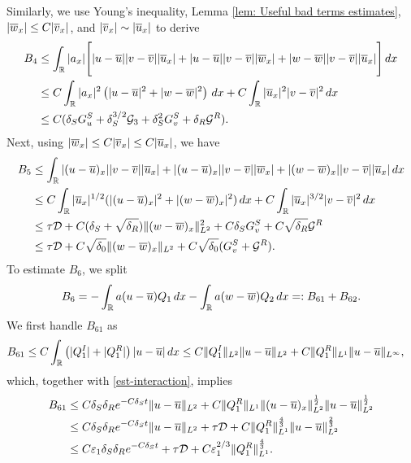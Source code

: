 \documentclass[11pt,reqno]{amsart}
\begin{document}
    Similarly, we use Young's inequality, Lemma \ref{lem: Useful bad terms estimates}, $|\overline{w}_x| \le C |\overline{v}_x| $, and  $|\overline{v}_x| \sim |\overline{u}_x|$ to derive
    \begin{align*}
    B_4 &\le \int_\mathbb{R} |a_x| \Bigg[ |u-\overline{u}| |v-\overline{v}|     |\overline{u}_x|  +|u-\overline{u}| |v-\overline{v}|  | \overline{w}_x|  + |w-\overline{w}| |v-\overline{v}| |\overline{u}_x|   \Bigg] \, dx \\ 
    &\le C \int_\mathbb{R} |a_x|^2 \left(|u-\overline{u}|^2+|w-\overline{w}|^2 \right)\,dx +C\int_\mathbb{R} |\overline{u}_x|^2 |v-\overline{v}|^2 \, dx \\ 
    &\le C (\delta_S G^S_u +  \delta_S^{3/2} \mathcal{G}_3 + \delta_S^2 G^S_v + \delta_R \mathcal{G}^R).
    \end{align*}
 	Next, using $|\overline{w}_x| \le C |\overline{v}_x| \le C |\overline{u}_x|$, we have
    \begin{align*}
    B_5 &\le \int_\mathbb{R}  |(u-\overline{u})_x| |v-\overline{v}|    |\overline{u}_x|  +  |(u-\overline{u})_x| |v-\overline{v}| | \overline{w}_x|  + |(w-\overline{w})_x| |v-\overline{v}| |\overline{u}_x|  \, dx \\
    &\le C \int_\mathbb{R} |\overline{u}_x|^{1/2} (|(u-\overline{u})_x|^2 + |(w-\overline{w})_x|^2 ) \, dx + C \int_\mathbb{R} |\overline{u}_x|^{3/2} |v-\overline{v}|^2 \, dx \\ 
    &\le \tau \mathcal{D} + C (\delta_S +\sqrt{\delta_R}) \|(w-\overline{w})_x\|_{L^2}^2+C \delta_S G^S_v+ C \sqrt{\delta_R} \mathcal{G}^R  \\
    &\le \tau \mathcal{D} + C \sqrt{\delta_0} \|(w-\overline{w})_x\|_{L^2} + C \sqrt{\delta_0} (G^S_v+\mathcal{G}^R).
    \end{align*}
	To estimate $B_6$, we split
	\[B_6 = -\int_{\mathbb{R}}a(u-\overline{u})Q_1\,dx -\int_{\mathbb{R}}a(w-\overline{w})Q_2\,dx=:B_{61}+B_{62}.\]
	We first handle $B_{61}$ as
    \begin{align*}
        B_{61} & \le C \int_\mathbb{R} \left( |Q_1^I| + |Q_1^R| \right) |u-\overline{u}| \, dx \le C  \|Q_1^I\|_{L^2} \| u-\overline{u} \|_{L^2} + C \|Q_1^R \|_{L^1} \| u-\overline{u} \|_{L^\infty}  ,
    \end{align*}
    which, together with \eqref{est-interaction}, implies
    \begin{equation*} %
        \begin{aligned}
            B_{61} &\le C \delta_S \delta_R e^{-C \delta_S t} \|u-\ou\|_{L^2} + C \|Q_1^R\|_{L^1} \|(u-\ou)_x\|_{L^2}^{\frac{1}{2}} \|u-\ou\|_{L^2}^{\frac{1}{2}} \\
            &\le C \delta_S \delta_R e^{-C \delta_S t} \|u-\ou\|_{L^2} + \tau \mathcal{D} + C \|Q_1^R\|_{L^1}^{\frac{4}{3}}  \|u-\ou\|_{L^2}^{\frac{2}{3}}\\
            &\le C \e_1\delta_S \delta_R e^{-C \delta_S t} + \tau\mathcal{D} + C \e_1^{2/3}\|Q_1^R\|_{L^1}^{\frac{4}{3}}.
        \end{aligned}
    \end{equation*}
\end{document}
